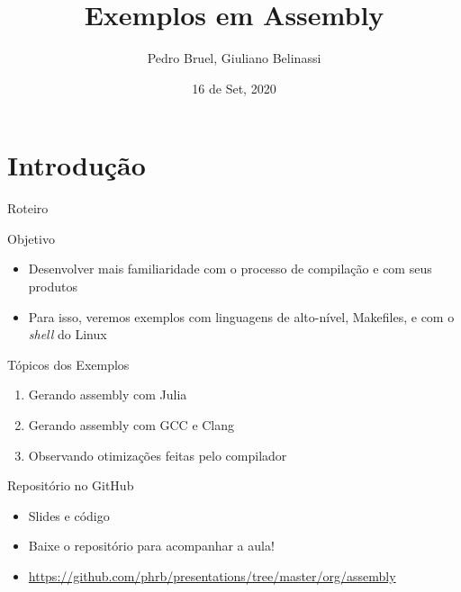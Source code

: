 \documentclass[10pt, compress, aspectratio=169, xcolor={table,usenames,dvipsnames}]{beamer}
\author{ \footnotesize Pedro Bruel, Giuliano Belinassi}
\date{ \scriptsize 16 de Set, 2020}
\title{Exemplos em Assembly}
\begin{document}
\maketitle

\section{Introdução}
\label{sec:org85bea16}
\begin{frame}[label={sec:orgcfa47c4}]{Roteiro}
\begin{block}{Objetivo}
\begin{itemize}
\item Desenvolver mais familiaridade com o processo de compilação e com seus produtos
\item Para isso, veremos  exemplos com linguagens de alto-nível,  Makefiles, e com o
\emph{shell} do Linux
\end{itemize}
\end{block}
\begin{block}{Tópicos dos Exemplos}
\begin{enumerate}
\item Gerando assembly com Julia
\item Gerando assembly com GCC e Clang
\item Observando otimizações feitas pelo compilador
\end{enumerate}
\end{block}
\begin{block}{Repositório no GitHub}
\begin{itemize}
\item Slides e código
\item Baixe o repositório para acompanhar a aula!
\item \url{https://github.com/phrb/presentations/tree/master/org/assembly}
\end{itemize}
\end{block}
\end{frame}
\end{document}
